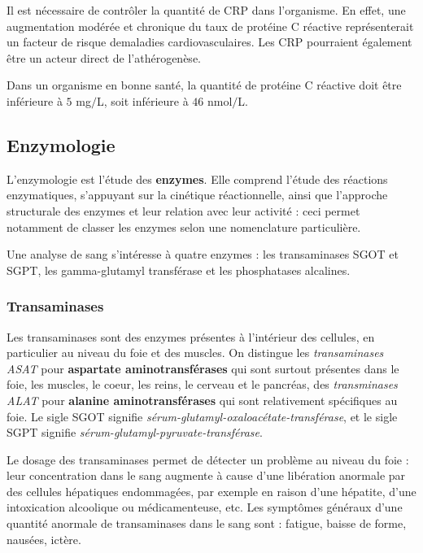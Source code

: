 \documentclass[12pt]{article}
\begin{document}
	Il est nécessaire de contrôler la quantité de CRP dans l'organisme. En effet, une augmentation modérée et chronique du taux de protéine C réactive représenterait un facteur de risque demaladies cardiovasculaires. Les CRP pourraient également être un acteur direct de l'athérogenèse.
	
	Dans un organisme en bonne santé, la quantité de protéine C réactive doit être inférieure à $5$ mg$/$L, soit inférieure à $46$ nmol$/$L.
	
	\subsection{Enzymologie}
	L'enzymologie est l'étude des \textbf{enzymes}. Elle comprend l'étude des réactions enzymatiques, s'appuyant sur la cinétique réactionnelle, ainsi que l'approche structurale des enzymes et leur relation avec leur activité : ceci permet notamment de classer les enzymes selon une nomenclature particulière.
	
	Une analyse de sang s'intéresse à quatre enzymes : les transaminases SGOT et SGPT, les gamma-glutamyl transférase et les phosphatases alcalines.
		
		\subsubsection{Transaminases}
	Les transaminases sont des enzymes présentes à l'intérieur des cellules, en particulier au niveau du foie et des muscles. On distingue les \textit{transaminases ASAT} pour \textbf{aspartate aminotransférases} qui sont surtout présentes dans le foie, les muscles, le coeur, les reins, le cerveau et le pancréas, des \textit{transminases ALAT} pour \textbf{alanine aminotransférases} qui sont relativement spécifiques au foie. Le sigle SGOT signifie \textit{sérum-glutamyl-oxaloacétate-transférase}, et le sigle SGPT signifie \textit{sérum-glutamyl-pyruvate-transférase}.
	
	Le dosage des transaminases permet de détecter un problème au niveau du foie : leur concentration dans le sang augmente à cause d'une libération anormale par des cellules hépatiques endommagées, par exemple en raison d'une hépatite, d'une intoxication alcoolique ou médicamenteuse, etc. Les symptômes généraux d'une quantité anormale de transaminases dans le sang sont : fatigue, baisse de forme, nausées, ictère. 
	
\end{document}
